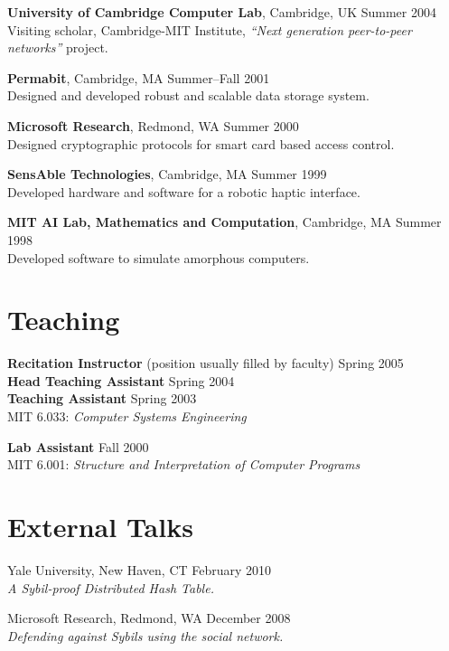 \documentclass[margin,line,11pt]{resume}
\let\oldsection=\section
\renewcommand{\section}[1]{\oldsection{\small\sc #1}}
\begin{document}
\begin{resume}
\textbf{University of Cambridge Computer Lab},
Cambridge, UK
\hfill
Summer 2004\\
Visiting scholar, Cambridge-MIT Institute, \textsl{``Next generation peer-to-peer networks''} project.

\textbf{Permabit},
Cambridge, MA
\hfill
Summer--Fall 2001\\
Designed and developed robust and scalable data storage system.

\textbf{Microsoft Research},
Redmond, WA
\hfill
Summer 2000\\
Designed cryptographic protocols for smart card based access control.

\textbf{SensAble Technologies},
Cambridge, MA
\hfill
Summer 1999\\
Developed hardware and software for a robotic haptic interface.

\textbf{MIT AI Lab, Mathematics and Computation},
Cambridge, MA
\hfill
Summer 1998\\
Developed software to simulate amorphous computers.



\section{Teaching}

\textbf{Recitation Instructor} (position usually filled by faculty) \hfill Spring 2005\\
\textbf{Head Teaching Assistant} \hfill Spring 2004\\
\textbf{Teaching Assistant} \hfill Spring 2003\\
MIT 6.033:
\textsl{Computer Systems Engineering}

\textbf{Lab Assistant} \hfill Fall 2000\\
MIT 6.001:
\textsl{Structure and Interpretation of Computer Programs}

\newpage





\section{External Talks}

Yale University, New Haven, CT \hfill February 2010\\
\textsl{A Sybil-proof Distributed Hash Table.}

Microsoft Research, Redmond, WA \hfill December 2008\\
\textsl{Defending against Sybils using the social network.}


\end{resume}
\end{document}
